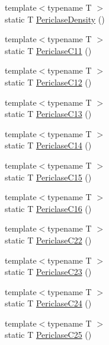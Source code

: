 \begin{DoxyCompactItemize}
\item 
{\footnotesize template$<$typename T $>$ }\\static T \mbox{\hyperlink{namespacempc_1_1data_af5b92f262d158182e3800498e73c2319}{Periclase\+Density}} ()
\item 
{\footnotesize template$<$typename T $>$ }\\static T \mbox{\hyperlink{namespacempc_1_1data_af7a6e22c741b17ba5ead3c591e5304d8}{Periclase\+C11}} ()
\item 
{\footnotesize template$<$typename T $>$ }\\static T \mbox{\hyperlink{namespacempc_1_1data_a163543d6ec6bc201a6b2ef94dd1c397d}{Periclase\+C12}} ()
\item 
{\footnotesize template$<$typename T $>$ }\\static T \mbox{\hyperlink{namespacempc_1_1data_a05b6dc33af8b3ec1162552ebda2bbdc8}{Periclase\+C13}} ()
\item 
{\footnotesize template$<$typename T $>$ }\\static T \mbox{\hyperlink{namespacempc_1_1data_a6d8ddcf3428f4145ecef1883aa1d0105}{Periclase\+C14}} ()
\item 
{\footnotesize template$<$typename T $>$ }\\static T \mbox{\hyperlink{namespacempc_1_1data_ac0f319b3f73405073f99abd65c033c58}{Periclase\+C15}} ()
\item 
{\footnotesize template$<$typename T $>$ }\\static T \mbox{\hyperlink{namespacempc_1_1data_aa1d9afc61cef9e96ef2d73a4139d1df2}{Periclase\+C16}} ()
\item 
{\footnotesize template$<$typename T $>$ }\\static T \mbox{\hyperlink{namespacempc_1_1data_a2fbd86b33193ff286eff699b80b71071}{Periclase\+C22}} ()
\item 
{\footnotesize template$<$typename T $>$ }\\static T \mbox{\hyperlink{namespacempc_1_1data_aebdff55c942386f876f1ced5df603987}{Periclase\+C23}} ()
\item 
{\footnotesize template$<$typename T $>$ }\\static T \mbox{\hyperlink{namespacempc_1_1data_a699ae309e513e74e1425bc14f6f460f1}{Periclase\+C24}} ()
\item 
{\footnotesize template$<$typename T $>$ }\\static T \mbox{\hyperlink{namespacempc_1_1data_a2f260d0caecfe10da3e77ab76a7e156a}{Periclase\+C25}} ()
\item 

\end{DoxyCompactItemize}
